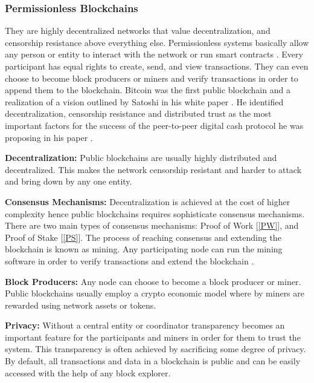 \subsubsection{Permissionless Blockchains} 
They are highly decentralized networks that value decentralization, and censorship resistance above everything else. Permissionless systems basically allow any person or entity to interact with the network or run smart contracts \cite{misc:018}. Every participant has equal rights to create, send, and view transactions. They can even choose to become block producers or miners and verify transactions in order to append them to the blockchain. Bitcoin was the first public blockchain and a realization of a vision outlined by Satoshi in his white paper \cite{paper:001}. He identified decentralization, censorship resistance and distributed trust as the most important factors for the success of the peer-to-peer digital cash protocol he was proposing in his paper \cite{paper:001}.

\textbf{Decentralization:}
Public blockchains are usually highly distributed and decentralized. This makes the network censorship resistant and harder to attack and bring down by any one entity. 

\textbf{Consensus Mechanisms:}
Decentralization is achieved at the cost of higher complexity hence public blockchains requires sophisticate consensus mechanisms. There are two main types of consensus mechanisms: Proof of Work [\ref{PW}], and Proof of Stake [\ref{PS}]. The process of reaching consensus and extending the blockchain is known as mining. Any participating node can run the mining software in order to verify transactions and extend the blockchain \cite{misc:018} \cite{misc:017}.

\textbf{Block Producers:}
Any node can choose to become a block producer or miner. Public blockchains usually employ a crypto economic model where by miners are rewarded using network assets or tokens.

\textbf{Privacy:}
Without a central entity or coordinator transparency becomes an important feature for the participants and miners in order for them to trust the system. This transparency is often achieved by sacrificing some degree of privacy. By default, all transactions and data in a blockchain is public and can be easily accessed with the help of any block explorer.  
\vspace{2cm}
